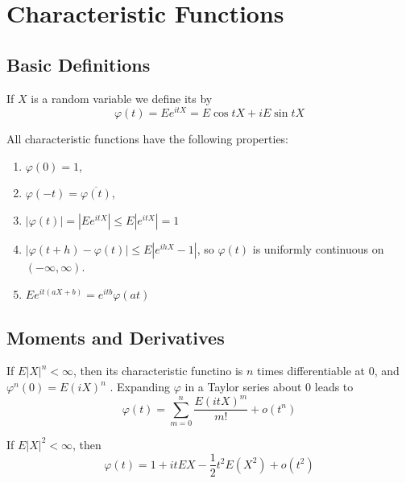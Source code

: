 \documentclass[../main.tex]{subfiles}
\begin{document}
\ifSubfilesClassLoaded{

    
}{}

\chapter{ Characteristic Functions }
\section{Basic Definitions}
\begin{definition}{}{}
If $X$ is a random variable we define its  by
\[
\varphi(t) = E e^{itX} = E \cos tX + i E \sin tX
\]
\end{definition}

\begin{theorem}{}{}
All characteristic functions have the following properties:
\begin{enumerate}
    \item[(a)] $\varphi(0)=1$,
    \item[(b)] $\varphi(-t)=\overline{\varphi(t)}$,
    \item[(c)] $|\varphi(t)|=|E e^{i t X}| \leq E|e^{i t X}|=1$
    \item[(d)] $|\varphi(t+h)-\varphi(t)| \leq E|e^{i h X}-1|$, so $\varphi(t)$ is uniformly continuous on $(-\infty, \infty)$.
    \item[(e)] $E e^{i t(a X+b)}=e^{i t b} \varphi(a t)$
\end{enumerate}
\end{theorem}


\section{Moments and Derivatives}

\begin{theorem}{}{}
    If \(  E\left| X \right|^{n}< \infty   \), then its characteristic functino is \(  n  \) times differentiable at \(  0  \), and \(   \varphi ^{n}\left( 0 \right)= E\left( iX \right)^{n}    \) . Expanding \(   \varphi   \) in a Taylor series about \(  0  \) leads to \[
     \varphi \left( t \right)= \sum _{m= 0}^{n}\frac{E\left( itX \right)^{m}  }{m! }+ o\left( t^{n} \right)   
    \]      
\end{theorem}

\begin{theorem}{}{}
    If \(  E\left| X \right|^{2}< \infty   \), then \[
     \varphi \left( t \right)= 1+ itEX- \frac{1}{2}t^{2}E\left( X^{2} \right)  + o\left( t^{2} \right) 
    \] 
\end{theorem}
\end{document}
